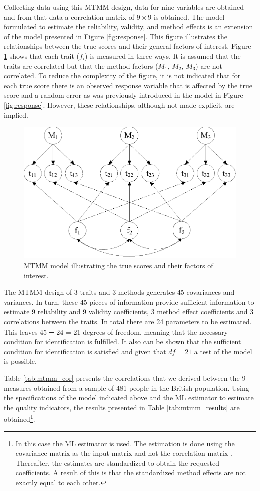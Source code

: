 \documentclass[a4paper,12pt]{article}
\begin{document}
Collecting data using this MTMM design, data for nine variables are obtained and from that data a correlation matrix of $9 \times 9$ is obtained. The model formulated to estimate the reliability, validity, and method effects is an extension of the model presented in Figure \ref{fig:response}. This figure illustrates the relationships between the true scores and their general factors of interest. Figure \ref{fig:mtmm} shows that each trait ($f_i$) is measured in three ways. It is assumed that the traits are correlated but that the method factors ($M_1$, $M_2$, $M_3$) are not correlated. To reduce the complexity of the figure, it is not indicated that for each true score there is an observed response variable that is affected by the true score and a random error as was previously introduced in the model in Figure \ref{fig:response}. However, these relationships, although not made explicit, are implied.  

\begin{figure}[htb]\centering
\includegraphics[width=.7\textwidth]{mtmm.eps}
\caption{\label{fig:mtmm}MTMM model illustrating the true scores and their factors of interest.}
\end{figure}
 
The MTMM design of 3 traits and 3 methods generates 45 covariances and variances. In turn, these 45 pieces of information provide sufficient information to estimate 9 reliability and 9 validity coefficients, 3 method effect coefficients and 3 correlations between the traits. In total there are 24 parameters to be estimated. This leaves 45 ─ 24 = 21 degrees of freedom, meaning that the necessary condition for identification is fulfilled. It also can be shown that the sufficient condition for identification is satisfied and given that $df=21$ a test of the model is possible.

Table \ref{tab:mtmm_cor} presents the correlations that we derived between the 9 measures obtained from a sample of 481 people in the British population. Using the specifications of the model indicated above and the ML estimator to estimate the quality indicators, the results presented in Table \ref{tab:mtmm_results} are obtained\footnote{In this case the ML estimator is used. The estimation is done using the covariance matrix as the input matrix and not the correlation matrix . Thereafter, the estimates are standardized to obtain the requested coefficients. A result of this is that the standardized  method effects are not exactly equal to each other.}.  
\end{document}
